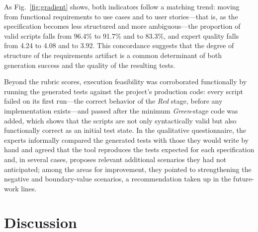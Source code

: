\documentclass[10pt,journal,twoside,letterpaper]{IEEEtran}
\begin{document}
    As Fig.~\ref{fig:gradient} shows, both indicators follow a matching trend: moving from functional requirements to use cases and to user stories---that is, as the specification becomes less structured and more ambiguous---the proportion of valid scripts falls from 96.4\% to 91.7\% and to 83.3\%, and expert quality falls from 4.24 to 4.08 and to 3.92. This concordance suggests that the degree of structure of the requirements artifact is a common determinant of both generation success and the quality of the resulting tests.
    
    Beyond the rubric scores, execution feasibility was corroborated functionally by running the generated tests against the project's production code: every script failed on its first run---the correct behavior of the \emph{Red} stage, before any implementation exists---and passed after the minimum \emph{Green}-stage code was added, which shows that the scripts are not only syntactically valid but also functionally correct as an initial test state. In the qualitative questionnaire, the experts informally compared the generated tests with those they would write by hand and agreed that the tool reproduces the tests expected for each specification and, in several cases, proposes relevant additional scenarios they had not anticipated; among the areas for improvement, they pointed to strengthening the negative and boundary-value scenarios, a recommendation taken up in the future-work lines.
    
    \section{Discussion}
    \label{sec:discusion}
    
\end{document}

